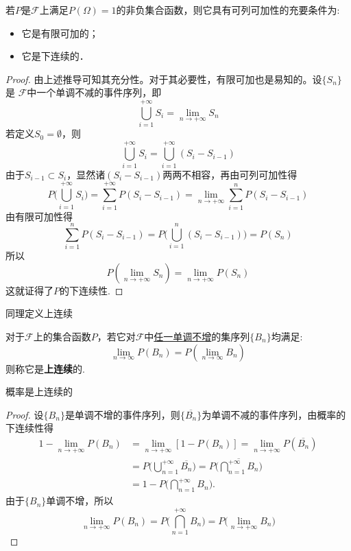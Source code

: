 \begin{theorem}
    若$P$是$\mathscr{F}$上满足$P(\Omega)=1$的非负集合函数，则它具有可列可加性的充要条件为:
    \begin{itemize}
        \item 它是有限可加的；
        \item 它是下连续的．
    \end{itemize}
\end{theorem}
\begin{proof}
    由上述推导可知其充分性。对于其必要性，有限可加也是易知的。设$\{S_n\}$是 $\mathscr{F}$中一个单调不减的事件序列，即
    \[ \bigcup _{i=1} ^{+\infty} S_i = \lim_{n \to +\infty} S_n \]
    若定义$S_0 = \emptyset$，则
    \[ \bigcup_{i=1}^{+\infty} S_i = \bigcup_{i=1}^{+\infty} (S_i - S_{i-1}) \]
    由于$S_{i-1} \subset S_i$，显然诸$(S_i-S_{i-1})$两两不相容，再由可列可加性得
    \[ P\biggl( \bigcup_{i=1}^{+\infty} S_i \biggr) = \sum_{i=1}^{+\infty} P(S_i - S_{i-1}) = \lim_{n \to +\infty} \sum_{i=1}^n P (S_i - S_{i-1}) \]
    由有限可加性得
    \[ \sum_{i=1}^n P(S_i - S_{i-1}) = P \biggl( \bigcup_{i=1}^n (S_i - S_{i-1}) \biggr) = P(S_n) \]
    所以
    \[ P(\lim_{n \to +\infty} S_n) = \lim_{n \to +\infty} P(S_n) \]
    这就证得了$P$的下连续性.
\end{proof}

同理定义上连续
\begin{definition}[上连续]
    对于$\mathscr{F}$上的集合函数$P$，若它对$\mathscr{F}$中\underline{任一单调不增}的集序列$\{ B_n \}$均满足:
    \[ \lim_{n \to \infty}P(B_n) =P(\lim_{n \to \infty} B_n) \]
    则称它是\textbf{上连续}的.
\end{definition}

\begin{theorem}
    概率是上连续的
\end{theorem}
\begin{proof}
    设$\{ B_n \}$是单调不增的事件序列，则$\{ \overline{B_n} \}$为单调不减的事件序列，由概率的下连续性得
    \begin{align*}
        1 - \lim_{n \to +\infty} P(B_n)
         & = \lim_{n \to +\infty} [1 - P(B_n)] = \lim_{n \to +\infty} P (\overline{B_n})                                         \\
         & = P \biggl( \bigcup_{n=1}^{+\infty} \overline{B_n} \biggr) = P \biggl( \overline{\bigcap _{n=1} ^{+\infty} B_n} \biggr) \\
         & = 1 - P \biggl( \bigcap_{n=1}^{+\infty} B_n \biggr).
    \end{align*}
    由于$\{ B_n \}$单调不增，所以
    \[ \lim_{n \to +\infty} P(B_n) = P \biggl( \bigcap_{n=1}^{+\infty} B_n \biggr) = P \biggl(\lim_{n \to +\infty} B_n \biggr) \]
\end{proof}

